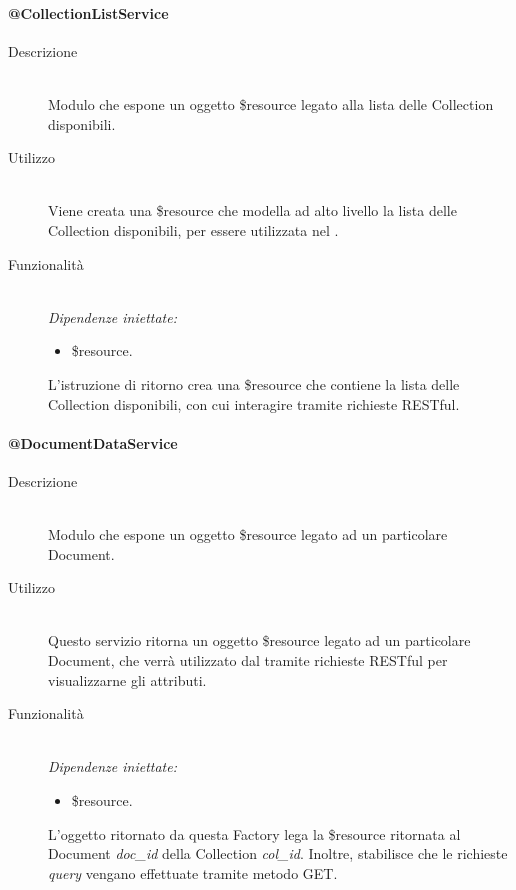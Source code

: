 \paragraph{@CollectionListService}
\begin{description}
 \item[Descrizione] \hfill \\
 Modulo che espone un oggetto \$resource legato alla lista delle Collection disponibili.
 
 \item[Utilizzo] \hfill \\
 Viene creata una \$resource che modella ad alto livello la lista delle Collection disponibili, per essere utilizzata nel .
 
 \item[Funzionalità] \hfill \\
 \emph{Dipendenze iniettate:}
 \begin{itemize}
  \item \$resource.
 \end{itemize}
 L'istruzione di ritorno crea una \$resource che contiene la lista delle Collection disponibili, con 
 cui interagire tramite richieste RESTful.
 
\end{description}

\paragraph{@DocumentDataService}
\begin{description}
 \item[Descrizione] \hfill \\
 Modulo che espone un oggetto \$resource legato ad un particolare Document.
 
 \item[Utilizzo] \hfill \\
 Questo servizio ritorna un oggetto \$resource legato ad un particolare Document, che verrà  utilizzato dal  tramite richieste RESTful per visualizzarne gli attributi.
 
 \item[Funzionalità] \hfill \\
 \emph{Dipendenze iniettate:}
 \begin{itemize}
  \item \$resource.
 \end{itemize}
 L'oggetto ritornato da questa Factory lega la \$resource ritornata al Document \textit{doc\_id} della Collection \textit{col\_id}. Inoltre, stabilisce che le richieste \textit{query} vengano effettuate tramite metodo GET. 
 
\end{description}

